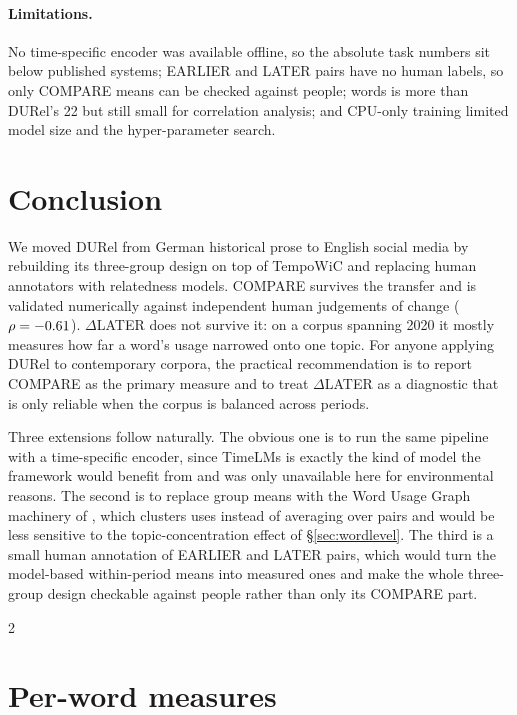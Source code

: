 \documentclass{article}
\newif\iffirstsectiondone
\let\originalsection\section
\renewcommand{\section}{%
  \iffirstsectiondone\Needspace*{0.12\textheight}\else\firstsectiondonetrue\fi
  \originalsection}
\begin{document}
\paragraph{Limitations.} No time-specific encoder was available offline, so the
absolute task numbers sit below published systems; EARLIER and LATER pairs have
no human labels, so only COMPARE means can be checked against people;
\numWords{} words is more than DURel's 22 but still small for correlation
analysis; and CPU-only training limited model size and the hyper-parameter
search.

\section{Conclusion}

We moved DURel from German historical prose to English social media by rebuilding
its three-group design on top of TempoWiC and replacing human annotators with
relatedness models. COMPARE survives the transfer and is validated numerically
against independent human judgements of change ($\rho=-0.61$).
$\Delta$LATER does not survive it: on a corpus spanning 2020 it mostly measures
how far a word's usage narrowed onto one topic. For anyone applying DURel to
contemporary corpora, the practical recommendation is to report COMPARE as the
primary measure and to treat $\Delta$LATER as a diagnostic that is only reliable
when the corpus is balanced across periods.

Three extensions follow naturally. The obvious one is to run the same pipeline
with a time-specific encoder, since TimeLMs is exactly the kind of model the
framework would benefit from and was only unavailable here for environmental
reasons. The second is to replace group means with the Word Usage Graph
machinery of \citet{schlechtweg2021dwug}, which clusters uses instead of
averaging over pairs and would be less sensitive to the topic-concentration
effect of \S\ref{sec:wordlevel}. The third is a small human annotation of
EARLIER and LATER pairs, which would turn the model-based within-period means
into measured ones and make the whole three-group design checkable against
people rather than only its COMPARE part.

{\footnotesize\setlength{\columnsep}{16pt}\begin{multicols}{2}

\end{multicols}}
\appendix
\section{Per-word measures}
\begin{table}[h]\centering\scriptsize
\caption{Per-word DURel measures. Sp.: TempoWiC split (tr/va/te). chg.\ rate:
share of COMPARE pairs labelled \emph{different meaning} by human annotators.}
\label{tab:words}

\end{table}
\end{document}
